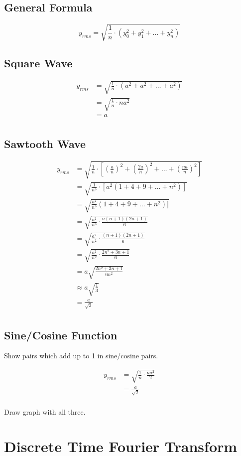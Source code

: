 \documentclass{exam}
\begin{document}
  \subsection{General Formula}
  \[
    y_{rms} = \sqrt{\frac{1}{n} \cdot \left( y_0^2 + y_1^2 + \ldots + y_n^2 \right) }
  \]

  \subsection{Square Wave}
  \begin{align*}
    y_{rms} & = \sqrt{\frac{1}{n} \cdot \left( a^2 + a^2 + \ldots + a^2 \right) } \\
            & = \sqrt{\frac{1}{n} \cdot na^2 } \\
            & = a \\
  \end{align*}

  \subsection{Sawtooth Wave}
  \begin{align*}
    y_{rms} & = \sqrt{\frac{1}{n} \cdot \left[ \left( \frac{a}{n} \right)^2 + \left( \frac{2a}{n} \right)^2 
        + \ldots + \left( \frac{na}{n} \right)^2 \right ] } \\
            & = \sqrt{\frac{1}{n^3} \cdot \left[ a^2 ( 1 + 4 + 9 + \dots + n^2 ) \right] } \\
            & = \sqrt{\frac{a^2}{n^3} ( 1 + 4 + 9 + \dots + n^2 ) ] } \\
            & = \sqrt{\frac{a^2}{n^3} \cdot \frac{n(n + 1)(2n + 1)}{6} } \\
            & = \sqrt{\frac{a^2}{n^2} \cdot \frac{(n + 1)(2n + 1)}{6} } \\
            & = \sqrt{\frac{a^2}{n^2} \cdot \frac{2n^2 + 3n + 1}{6} } \\
            & = a \sqrt{ \frac{2n^2 + 3n + 1}{6n^2} } \\
            & \approx a \sqrt{ \frac{1}{3} } \\
            & = \frac{a}{\sqrt{3}} \\
  \end{align*}

  \subsection{Sine/Cosine Function}
  Show pairs which add up to 1 in sine/cosine pairs.

  \begin{align*}
    y_{rms} & = \sqrt{\frac{1}{n} \cdot \frac{na^2}{2} } \\
            & = \frac{a}{\sqrt{2}} \\
  \end{align*}

  Draw graph with all three.

  \section{Discrete Time Fourier Transform}
\end{document}
